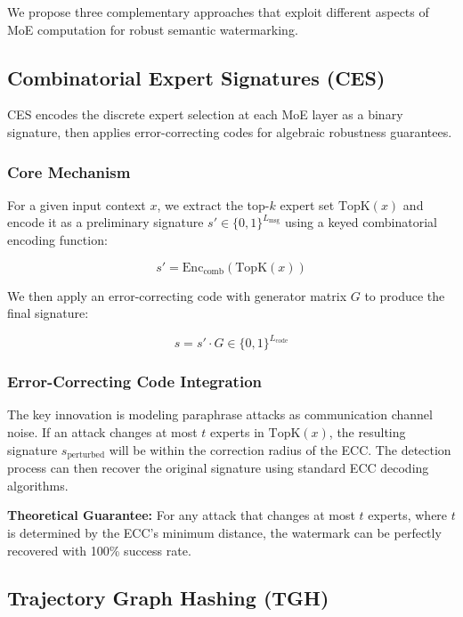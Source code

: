 We propose three complementary approaches that exploit different aspects of MoE computation for robust semantic watermarking.

\subsection{Combinatorial Expert Signatures (CES)}

CES encodes the discrete expert selection at each MoE layer as a binary signature, then applies error-correcting codes for algebraic robustness guarantees.

\subsubsection{Core Mechanism}

For a given input context $x$, we extract the top-$k$ expert set $\text{TopK}(x)$ and encode it as a preliminary signature $s' \in \{0,1\}^{L_{\text{msg}}}$ using a keyed combinatorial encoding function:

\begin{equation}
s' = \text{Enc}_{\text{comb}}(\text{TopK}(x))
\end{equation}

We then apply an error-correcting code with generator matrix $G$ to produce the final signature:

\begin{equation}
s = s' \cdot G \in \{0,1\}^{L_{\text{code}}}
\end{equation}

\subsubsection{Error-Correcting Code Integration}

The key innovation is modeling paraphrase attacks as communication channel noise. If an attack changes at most $t$ experts in $\text{TopK}(x)$, the resulting signature $s_{\text{perturbed}}$ will be within the correction radius of the ECC. The detection process can then recover the original signature using standard ECC decoding algorithms.

\textbf{Theoretical Guarantee:} For any attack that changes at most $t$ experts, where $t$ is determined by the ECC's minimum distance, the watermark can be perfectly recovered with 100\% success rate.

\subsection{Trajectory Graph Hashing (TGH)}

